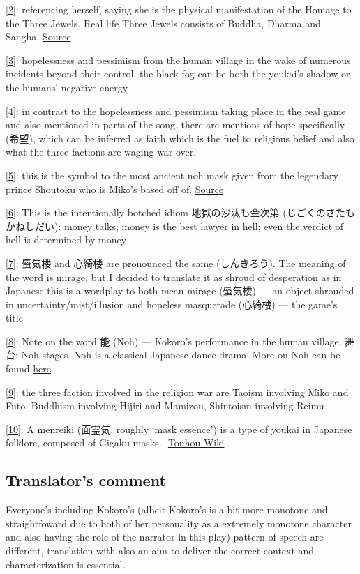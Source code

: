 \documentclass{article}
\newcommand{\tlnoteref}[1]{\hypertarget{#1tonote}{}\hyperlink{#1}{[#1]}}
\begin{document}
\tlnoteref{2}: referencing herself, saying she is the physical manifestation of the Homage to the Three Jewels. Real life Three Jewels consists of Buddha, Dharma and Sangha. \href{https://en.wikipedia.org/wiki/Refuge_(Buddhism)}{Source}

\tlnoteref{3}: hopelessness and pessimism from the human village in the wake of numerous incidents beyond their control, the black fog can be both the youkai's shadow or the humans' negative energy

\tlnoteref{4}: in contrast to the hopelessness and pessimism taking place in the real game and also mentioned in parts of the song, there are mentions of hope specifically (希望), which can be inferred as faith which is the fuel to religious belief and also what the three factions are waging war over.

\tlnoteref{5}: this is the symbol to the most ancient noh mask given from the legendary prince Shoutoku who is Miko's based off of. \href{en.wikipedia.org/wiki/Noh#Masks}{Source}

\tlnoteref{6}: This is the intentionally botched idiom 地獄の沙汰も金次第 (じごくのさたもかねしだい): money talks; money is the best lawyer in hell; even the verdict of hell is determined by money

\tlnoteref{7}: 蜃気楼 and 心綺楼 are pronounced the same (しんきろう). The meaning of the word is mirage, but I decided to translate it as shroud of desperation as in Japanese this is a wordplay to both mean mirage (蜃気楼) --- an object shrouded in uncertainty/mist/illusion and hopeless masquerade (心綺楼) --- the game's title

\tlnoteref{8}: Note on the word 能 (Noh) --- Kokoro's performance in the human village. 舞台: Noh stages. Noh is a classical Japanese dance-drama. More on Noh can be found \href{https://en.wikipedia.org/wiki/Noh}{here}

\tlnoteref{9}: the three faction involved in the religion war are Taoism involving Miko and Futo, Buddhism involving Hijiri and Mamizou, Shintoism involving Reimu

\tlnoteref{10}: A menreiki (面霊気, roughly `mask essence') is a type of youkai in Japanese folklore, composed of Gigaku masks. -\href{https://en.touhouwiki.net/wiki/Menreiki}{Touhou Wiki}
\subsection{Translator's comment}

Everyone's including Kokoro's (albeit Kokoro's is a bit more monotone and straightfoward due to both of her personality as a extremely monotone character and also having the role of the narrator in this play) pattern of speech are different, translation with also an aim to deliver the correct context and characterization is essential.
\end{document}
